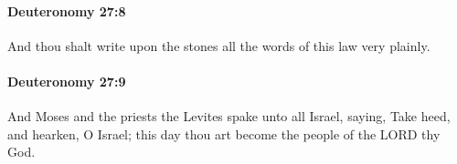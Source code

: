 		\paragraph{Deuteronomy 27:8} %
			\label{DEUTERONOMY-27-8}

			And thou shalt write upon the stones all the words of this law very plainly.


		\paragraph{Deuteronomy 27:9} %
			\label{DEUTERONOMY-27-9}

			And Moses and the priests the Levites spake unto all Israel, saying, Take heed, and hearken, O Israel; this day thou art become the people of the LORD thy God.


